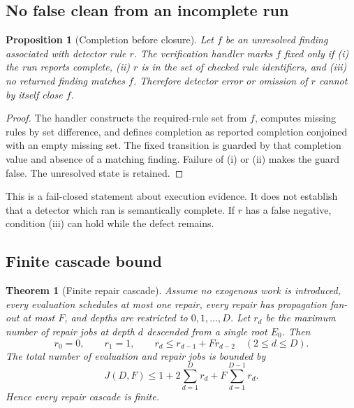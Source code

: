 \documentclass[11pt]{article}
\newtheorem{theorem}[definition]{Theorem}
\newtheorem{proposition}[definition]{Proposition}
\begin{document}
\subsection{No false clean from an incomplete run}

\begin{proposition}[Completion before closure]
\label{prop:completion}
Let $f$ be an unresolved finding associated with detector rule $r$. The verification handler
marks $f$ fixed only if (i) the run reports complete, (ii) $r$ is in the set of checked rule
identifiers, and (iii) no returned finding matches $f$. Therefore detector error or omission
of $r$ cannot by itself close $f$.
\end{proposition}

\begin{proof}
The handler constructs the required-rule set from $f$, computes missing rules by set
difference, and defines completion as reported completion conjoined with an empty missing
set. The fixed transition is guarded by that completion value and absence of a matching
finding. Failure of (i) or (ii) makes the guard false. The unresolved state is retained.
\end{proof}

This is a fail-closed statement about execution evidence. It does not establish that a
detector which ran is semantically complete. If $r$ has a false negative, condition (iii) can
hold while the defect remains.

\subsection{Finite cascade bound}

\begin{theorem}[Finite repair cascade]
\label{thm:finite}
Assume no exogenous work is introduced, every evaluation schedules at most one repair, every
repair has propagation fan-out at most $F$, and depths are restricted to
$0,1,\ldots,D$. Let $r_d$ be the maximum number of repair jobs at depth $d$ descended from a
single root $E_0$. Then
\[
 r_0=0,\qquad r_1=1,\qquad
 r_d\le r_{d-1}+F r_{d-2}\quad(2\le d\le D).
\]
The total number of evaluation and repair jobs is bounded by
\begin{equation}
  J(D,F)\le 1 + 2\sum_{d=1}^{D}r_d
                + F\sum_{d=1}^{D-1}r_d.
  \label{eq:jobbound}
\end{equation}
Hence every repair cascade is finite.
\end{theorem}
\end{document}
